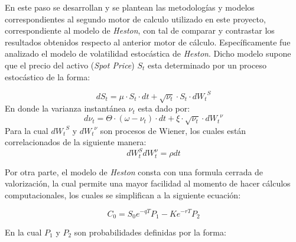\noindent En este paso se desarrollan y se plantean las metodologías y modelos correspondientes al segundo motor de calculo utilizado en este proyecto, correspondiente al modelo de \textit{Heston}, con tal de comparar y contrastar los resultados obtenidos respecto al anterior motor de cálculo. Específicamente fue analizado el modelo de volatilidad estocástica de \textit{Heston}. Dicho modelo supone que el precio del activo (\textit{Spot Price}) $S_t$ esta determinado por un proceso estocástico de la forma: 

\begin{equation}
    dS_t=\mu \cdot S_t \cdot dt+\sqrt{\nu_t}\cdot S_t \cdot {dW_t}^S
    \label{SHeston}
\end{equation}
\noindent En donde la varianza instantánea $\nu_t$ esta dado por:
\begin{equation}
    d\nu_t=\Theta\cdot (\omega-\nu_t) \cdot dt+\xi \cdot \sqrt{\nu_t}\cdot {dW_t}^\nu
    \label{volHeston}
\end{equation}
\noindent Para la cual ${dW_t}^S$ y ${dW_t}^\nu$ son procesos de Wiener, los cuales están correlacionados de la siguiente manera:
\begin{equation}
    d W_{t}^{S} d W_{ t}^{\nu}=\rho d t
\end{equation}

\noindent Por otra parte, el modelo de \textit{Heston} consta con una formula cerrada de valorización, la cual permite una mayor facilidad al momento de hacer cálculos computacionales, los cuales se simplifican a la siguiente ecuación:

\begin{equation}
    C_{0}=S_{0} e^{-q T} P_{1}-K e^{-r T} P_{2}
\end{equation}

\noindent En la cual $P_1$ y $P_2$ son probabilidades definidas por la forma:


